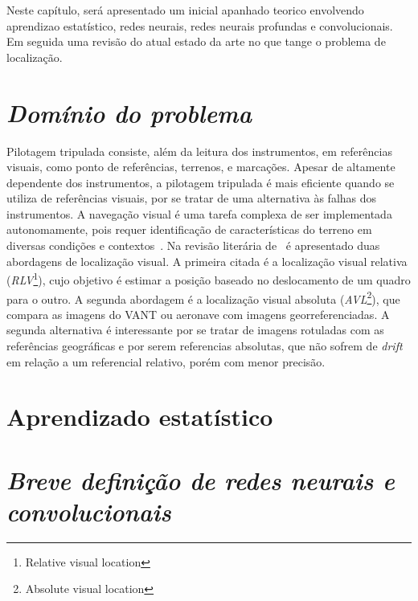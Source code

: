 Neste capítulo, será apresentado um inicial apanhado teorico envolvendo aprendizao estatístico, redes neurais, redes neurais profundas e convolucionais. Em seguida uma revisão do atual estado da arte no que tange o problema de localização.

\section{\textit{Domínio do problema}}\label{sec:Cap2_dominio}

Pilotagem tripulada consiste, além da leitura dos instrumentos, em referências visuais, como ponto de referências, terrenos, e marcações. Apesar de altamente dependente dos instrumentos, a pilotagem tripulada é mais eficiente quando se utiliza de referências visuais, por se tratar de uma alternativa às falhas dos instrumentos. A navegação visual é uma tarefa complexa de ser implementada autonomamente, pois requer identificação de características do terreno em diversas condições e contextos~\cite{rs13194017}. Na revisão literária de~\cite{COUTURIER2021103666} é apresentado duas abordagens de localização visual. A primeira citada é a localização visual relativa (\textit{RLV}\footnote{Relative visual location}), cujo objetivo é estimar a posição baseado no deslocamento de um quadro para o outro. A segunda abordagem é a localização visual absoluta (\textit{AVL}\footnote{Absolute visual location}), que compara as imagens do VANT ou aeronave com imagens georreferenciadas. A segunda alternativa é interessante por se tratar de imagens rotuladas com as referências geográficas e por serem referencias absolutas, que não sofrem de \textit{drift} em relação a um referencial relativo, porém com menor precisão.

 \section{Aprendizado estatístico}\label{sec:aprendizado_estatistico}

\section{\textit{Breve definição de redes neurais e convolucionais}}\label{sec:Cap2_definicoes}


